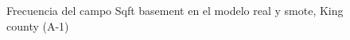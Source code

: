 \begin{figure}[H]
    \centering
    
    \caption{Frecuencia del campo Sqft basement en el modelo real y smote, King county (A-1)}
    \label{frecuency-smote-sqft basement}
\end{figure}